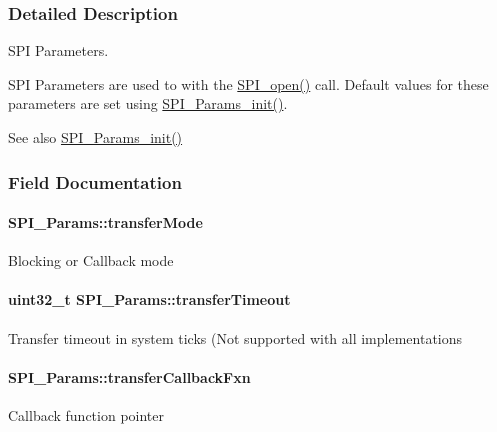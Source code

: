 \subsubsection{Detailed Description}
S\+P\+I Parameters. 

S\+P\+I Parameters are used to with the \hyperlink{_s_p_i_8h_a62cfe494cb1df47cd602e8747e894fd1}{S\+P\+I\+\_\+open()} call. Default values for these parameters are set using \hyperlink{_s_p_i_8h_a9c3dd1748332fd6e31c79a6538a71642}{S\+P\+I\+\_\+\+Params\+\_\+init()}.

\begin{DoxySeeAlso}{See also}
\hyperlink{_s_p_i_8h_a9c3dd1748332fd6e31c79a6538a71642}{S\+P\+I\+\_\+\+Params\+\_\+init()} 
\end{DoxySeeAlso}


\subsubsection{Field Documentation}
\paragraph[{transfer\+Mode}]{ S\+P\+I\+\_\+\+Params\+::transfer\+Mode}\label{struct_s_p_i___params_a16dbcc3768a01fb7deae25b48fc0d69c}
Blocking or Callback mode 
\paragraph[{transfer\+Timeout}]{\setlength{\rightskip}{0pt plus 5cm}uint32\+\_\+t S\+P\+I\+\_\+\+Params\+::transfer\+Timeout}\label{struct_s_p_i___params_a600801907cf396a96825eaf69781913a}
Transfer timeout in system ticks (Not supported with all implementations 
\paragraph[{transfer\+Callback\+Fxn}]{ S\+P\+I\+\_\+\+Params\+::transfer\+Callback\+Fxn}\label{struct_s_p_i___params_a68d1d610da6a6bf299121b939ef2a352}
Callback function pointer 
